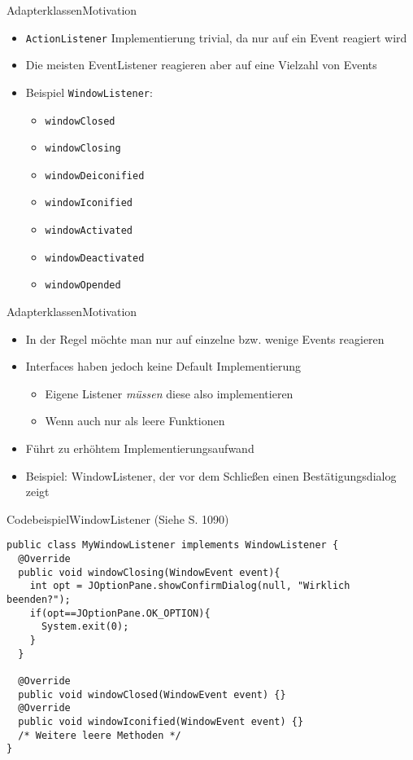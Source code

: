\begin{frame}{Adapterklassen}{Motivation}
    \begin{itemize}
        \item \texttt{ActionListener} Implementierung trivial, da nur auf ein Event reagiert wird
        \item Die meisten EventListener reagieren aber auf eine Vielzahl von Events
        \item Beispiel \texttt{WindowListener}:
        \begin{itemize}
            \item \texttt{windowClosed}
            \item \texttt{windowClosing}
            \item \texttt{windowDeiconified}
            \item \texttt{windowIconified}
            \item \texttt{windowActivated}
            \item \texttt{windowDeactivated}
            \item \texttt{windowOpended}
        \end{itemize}
    \end{itemize}
\end{frame}

\begin{frame}{Adapterklassen}{Motivation}
    \begin{itemize}
        \item In der Regel möchte man nur auf einzelne bzw. wenige Events reagieren
        \item Interfaces haben jedoch keine Default Implementierung
        \begin{itemize}
            \item Eigene Listener \textit{müssen} diese also implementieren
            \item Wenn auch nur als leere Funktionen
        \end{itemize}
        \item Führt zu erhöhtem Implementierungsaufwand
        \item Beispiel: WindowListener, der vor dem Schließen einen Bestätigungsdialog zeigt
    \end{itemize}
\end{frame}

\begin{frame}[fragile]{Codebeispiel}{WindowListener (Siehe \cite{ullenboom2018java} S. 1090)}
\lstset{style=java}
\begin{lstlisting}
public class MyWindowListener implements WindowListener {
  @Override
  public void windowClosing(WindowEvent event){
    int opt = JOptionPane.showConfirmDialog(null, "Wirklich beenden?");
    if(opt==JOptionPane.OK_OPTION){
      System.exit(0);
    }
  }
  
  @Override
  public void windowClosed(WindowEvent event) {}
  @Override
  public void windowIconified(WindowEvent event) {}
  /* Weitere leere Methoden */
}
\end{lstlisting}
\end{frame}

